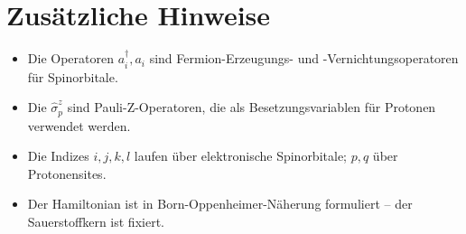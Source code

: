 \documentclass[12pt]{article}
\begin{document}
	\section*{Zusätzliche Hinweise}
	
	\begin{itemize}
		\item Die Operatoren $a_i^\dagger, a_i$ sind Fermion-Erzeugungs- und -Vernichtungsoperatoren für Spinorbitale.
		\item Die $\hat{\sigma}_p^z$ sind Pauli-Z-Operatoren, die als Besetzungsvariablen für Protonen verwendet werden.
		\item Die Indizes $i, j, k, l$ laufen über elektronische Spinorbitale; $p, q$ über Protonensites.
		\item Der Hamiltonian ist in Born-Oppenheimer-Näherung formuliert – der Sauerstoffkern ist fixiert.
	\end{itemize}
	
\end{document}
